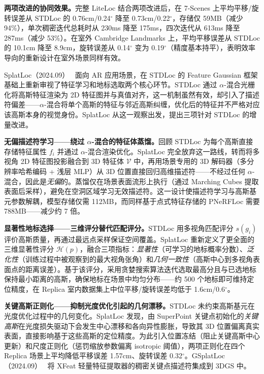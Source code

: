\textbf{两项改进的协同效果。}完整 LiteLoc 结合两项改进后，在 7-Scenes 上平均平移/旋转误差从 STDLoc 的 0.76cm/0.24$^\circ$ 降至 0.73cm/0.22$^\circ$，存储仅 59MB（减少 94\%），单次稠密迭代总耗时从 230ms 降至 175ms，四次迭代从 613ms 降至 287ms（减少 53\%）。在室外 Cambridge Landmarks 上，平均平移误差从 STDLoc 的 10.1cm 降至 8.9cm，旋转误差从 0.14$^\circ$ 变为 0.19$^\circ$（精度基本持平），表明效率导向的重新设计在室外场景同样有效。

SplatLoc（2024.09）~\cite{2409_14067} 面向 AR 应用场景，在 STDLoc 的 Feature Gaussian 框架基础上重新审视了特征学习和地标选取两个核心环节。STDLoc 通过 $\alpha$-混合光栅化将高斯特征渲染为 2D 特征图并与真值对齐，这一机制虽然有效，却引入了描述符偏差——$\alpha$-混合将单个高斯的特征与邻近高斯纠缠，优化后的特征并不严格对应该高斯本身的视觉身份。SplatLoc 从这一观察出发，提出三项针对 STDLoc 的增量改进。

\textbf{无偏描述符学习——绕过 $\alpha$-混合的特征体蒸馏。}回顾 STDLoc 为每个高斯直接存储特征属性 $f_i$ 并通过 $\alpha$-混合渲染优化。SplatLoc 完全放弃这一路线，转而将多视角 2D 特征图投影融合到 3D 特征体 $\mathcal{V}$ 中，再用场景专用的 3D 解码器（多分辨率哈希编码 + 浅层 MLP）从 3D 位置直接回归高维描述符——不经过任何 $\alpha$-混合，因此是\emph{无偏}的。蒸馏仅在场景表面流形上执行（通过 Marching Cubes 提取表面后采样），避免在空洞区域学习无效描述符。这一设计使描述符学习与高斯基元参数解耦，模型存储仅需 112MB，而同样基于点式特征存储的 PNeRFLoc 需要 788MB——减少约 7 倍。

\textbf{显著性地标选择——三维评分替代匹配评分。}STDLoc 用多视角匹配评分 $s(g_i)$ 评价高斯质量，再通过最远点采样保证空间覆盖。SplatLoc 重新定义了更全面的三维显著性评分 $\mathcal{H}(p)$，融合三项指标：\emph{显著性}（可学习的地标概率分数）、\emph{泛化性}（训练过程中被观察到的最大视角张角）和\emph{几何一致性}（高斯中心到多视角表面点的距离误差）。基于该评分，采用贪婪搜索算法迭代选取最高分且与已选地标保持最小距离的高斯，确保地标在场景中均匀分布——约 500 个地标即可维持定位精度，在 Replica 室内数据集上中位平移/旋转误差均低于 1.6cm/0.6$^\circ$。

\textbf{关键高斯正则化——抑制光度优化引起的几何漂移。}STDLoc 未约束高斯基元在光度优化过程中的几何变化。SplatLoc 发现，由 SuperPoint 关键点初始化的\emph{关键高斯}在光度损失驱动下会发生中心漂移和各向异性膨胀，导致其 3D 位置偏离真实表面，直接影响基于这些高斯的定位精度。为此引入位置冻结（阻止关键高斯中心更新）和尺度正则化（惩罚缩放参数偏离 isotropic 阈值），两项正则化在四个 Replica 场景上平均降低平移误差 1.57cm、旋转误差 0.32$^\circ$。GSplatLoc（2024.09）~\cite{2409_16502} 将 XFeat 轻量特征提取器的稠密关键点描述符集成到 3DGS 中。

